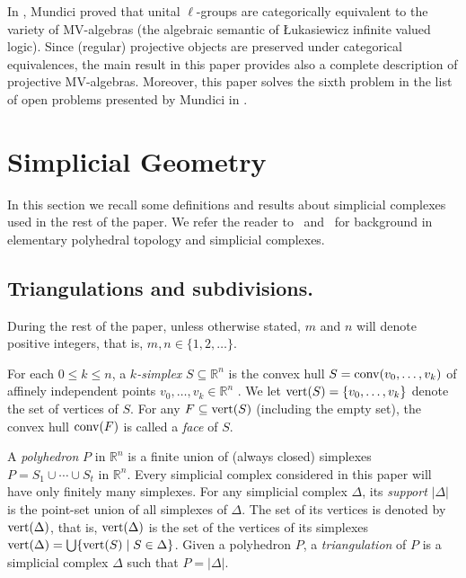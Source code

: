 \documentclass[reqno, draft]{amsart}
\theoremstyle{definition}
\begin{document}
In \cite{Mu1986}, Mundici proved that unital $\ell$-groups are 
categorically equivalent to the variety of MV-algebras 
(the algebraic semantic of \L ukasiewicz infinite valued logic). 
Since (regular) projective objects are preserved under categorical 
equivalences, the main result in this paper provides also a
 complete description of projective MV-algebras. 
Moreover, this paper solves the sixth problem in the list of open problems
presented by Mundici in \cite{Mu2011}.

\section{Simplicial Geometry}
In this section we recall some definitions and results 
about  simplicial complexes used in the rest of the paper. 
We refer the reader to~\cite{Ewa1996}  and~\cite{Sta1967} 
for background 
in elementary polyhedral topology and simplicial complexes. 

\subsection{Triangulations and subdivisions.}

During the rest of the paper, unless  otherwise stated, 
 $m$ and $n$ will denote positive integers, 
that is,  $m,n\in\{1,2,\ldots\}$.

For each $0\leq k\leq n$, a {\it $k$-simplex} $S\subseteq{\mathbb{R}}^n$ is the convex hull 
$S =\operatorname{{\rm conv}}(v_{0},\dots,v_k)$ of
affinely independent points $v_{0},\dots,v_k\in{\mathbb{R}}^n$  . 
We let $\operatorname{{\rm vert}}(S)=\{v_{0},\dots,v_k\}$ 
denote the set of vertices of $S$.
For any $F\subseteq \operatorname{{\rm vert}}(S)$ (including the empty set), 
the convex hull $\operatorname{{\rm conv}}(F)$ is called a
{\it face} of $S$.

A {\it polyhedron} $P$  in ${\mathbb{R}}^{n}$  is a finite union of 
(always closed) simplexes $P=S_{1}\cup\cdots\cup S_{t}$ in ${\mathbb{R}}^n$.
Every simplicial complex considered in this paper 
will have only finitely many simplexes.
For any  simplicial complex $\Delta$, 
its {\it support} $|\Delta|$ is the point-set union 
of all simplexes of $\Delta$. 
The set of its vertices is denoted by $\operatorname{{\rm vert}}(\Delta)$, that is, 
 $\operatorname{{\rm vert}}(\Delta)$ is the set of the vertices of its simplexes 
$\operatorname{{\rm vert}}(\Delta)=\bigcup\{\operatorname{{\rm vert}}(S)\mid S\in\Delta\}$.
Given a polyhedron $P$,  
a {\it triangulation}  of $P$ is a simplicial complex $\Delta$
 such that $P=|\Delta|$.
\end{document}
